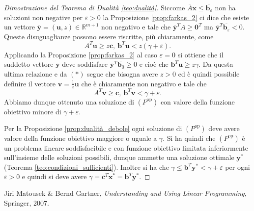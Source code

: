 \documentclass[italian, letter paper, 12pt, reqno]{article}
\theoremstyle{myteo}
\numberwithin{equation}{section}
\newcommand{\dual}[1]{#1^{\text{op}}}
\begin{document}
\begin{proof}[Dimostrazione del Teorema di Dualità \ref{teo:dualità}]
  Siccome \(\overline{A}\textbf{x} \leq \overline{\textbf{b}_\varepsilon}\) non ha soluzioni non negative per \(\varepsilon>0\) la Proposizione \ref{prop:farkas_2} ci dice che esiste un vettore \(\overline{\textbf{y}}=(\textbf{u}, z)\in \mathbb{R}^{m+1}\) non negativo e tale che \(\overline{\textbf{y}}^TA \geq \textbf{0}^T\) ma \(\overline{\textbf{y}}^T\overline{\textbf{b}_\varepsilon} < 0\).
  Queste disuguaglianze possono essere riscritte, più chiaramente, come
  \begin{equation*}
    \tag{\(*\)}
    A^T \textbf{u} \geq z \textbf{c},\ \textbf{b}^T \textbf{u} < z(\gamma + \varepsilon).
  \end{equation*}
  Applicando la Proposizione \ref{prop:farkas_2} al caso \(\varepsilon=0\) si ottiene che il suddetto vettore \(\overline{\textbf{y}}\) deve soddisfare \(\overline{\textbf{y}}^T \overline{\textbf{b}_0} \geq 0\) e cioè che \(\textbf{b}^T \textbf{u} \ge z\gamma\).
  Da questa ultima relazione e da \((*)\) segue che bisogna avere \(z>0\) ed è quindi possibile definire il vettore \(\textbf{v} = \frac{1}{z}\textbf{u}\) che è chiaramente non negativo e tale che
  \begin{equation*}
    A^T \textbf{v} \geq \textbf{c},\ \textbf{b}^T \textbf{v} < \gamma + \varepsilon.
  \end{equation*}
  Abbiamo dunque ottenuto una soluzione di \((\dual{P})\) con valore della funzione obiettivo minore di \(\gamma + \varepsilon\).

  Per la Proposizione \ref{prop:dualità_debole} ogni soluzione di \((\dual{P})\) deve avere valore della funzione obiettivo maggiore o uguale a \(\gamma\).
  Si ha quindi che \((\dual{P})\) è un problema lineare soddisfacibile e con funzione obiettivo limitata inferiormente sull'insieme delle soluzioni possibili, dunque ammette una soluzione ottimale \(\textbf{y}^*\) (Teorema \ref{teo:condizioni_sufficienti}).
  Inoltre si ha che \(\gamma \le \textbf{b}^T\textbf{y}^* < \gamma + \varepsilon\) per ogni \(\varepsilon>0\) e quindi si deve avere \(\gamma = \textbf{c}^T \textbf{x}^* = \textbf{b}^T\textbf{y}^*\).
\end{proof}

\begin{thebibliography}{1}
  Jiri Matousek \& Bernd Gartner,
  \textit{Understanding and Using Linear Programming},
  Springer,
  2007.
\end{thebibliography}
\end{document}
